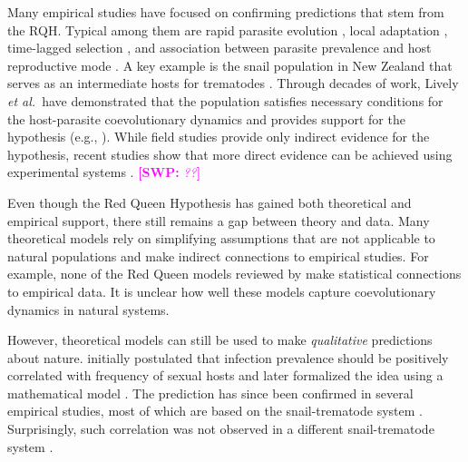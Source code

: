 \documentclass{article}\usepackage[]{graphicx}\usepackage[]{color}
\newcommand{\etal}{\textit{et al.}}
\newcommand{\comment}[3]{\textcolor{#1}{\textbf{[#2: }\textit{#3}\textbf{]}}}
\newcommand{\swp}[1]{\comment{magenta}{SWP}{#1}}
\begin{document}
Many empirical studies have focused on confirming predictions that stem from the RQH.
Typical among them are rapid parasite evolution \citep{rauch2006one}, local adaptation \citep{lively1989adaptation, morran2014experimental, king2011coevolutionary, gibson2016within}, time-lagged selection \citep{buckling2002antagonistic, decaestecker2007host, koskella2009evidence, thrall2012rapid, koskella2013phage, koskella2014bacteria}, and association between parasite prevalence and host reproductive mode \citep{lively1992parthenogenesis, vergara2013geographic, verhoeven2013geographic}. 
A key example is the snail population in New Zealand that serves as an intermediate hosts for trematodes \citep{winterbourn1974larval, mcarthur1976suppression}.
Through decades of work, Lively \etal\ have demonstrated that the population satisfies necessary conditions for the host-parasite coevolutionary dynamics and provides support for the hypothesis (e.g., \cite{lively1987evidence, lively1989adaptation, dybdahl1995host, dybdahl1998host, jokela2009maintenance, vergara2014infection, gibson2016within}).
While field studies provide only indirect evidence for the hypothesis, 
recent studies show that more direct evidence can be achieved using experimental systems \citep{auld2016sex, slowinski2016coevolutionary}.
\swp{??}

Even though the Red Queen Hypothesis has gained both theoretical and empirical support, there still remains a gap between theory and data.
Many theoretical models rely on simplifying assumptions that are not applicable to natural populations and make indirect connections to empirical studies.
For example, none of the Red Queen models reviewed by \cite{ashby2015diversity} make statistical connections to empirical data.
It is unclear how well these models capture coevolutionary dynamics in natural systems.

However, theoretical models can still be used to make \emph{qualitative} predictions about nature.
\cite{lively1992parthenogenesis} initially postulated that infection prevalence should be positively correlated with frequency of sexual hosts and later formalized the idea using a mathematical model \citep{lively2001trematode}.
The prediction has since been confirmed in several empirical studies, most of which are based on the snail-trematode system \citep{lively2002temporal, kumpulainen2004parasites, king2011parasites, vergara2013geographic, mckone2016fine, gibson2016within}.
Surprisingly, such correlation was not observed in a different snail-trematode system \citep{heller1990sexual, ben2005spatial, ben2007temporal, ben2008sex, dagan2013clonal}.
\end{document}
